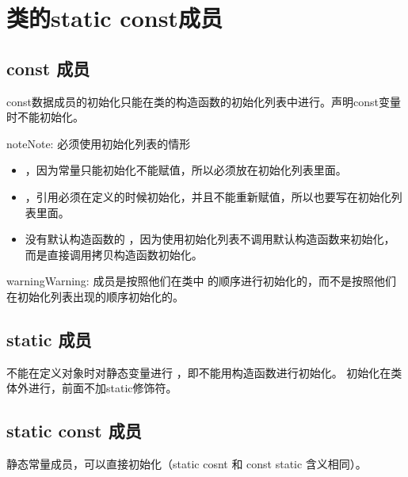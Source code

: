 \documentclass[letterpaper,10pt,english]{sphinxmanual}
\begin{document}
\section{类的static const成员}
\label{\detokenize{cpp/16_staticconst:static-const}}\label{\detokenize{cpp/16_staticconst::doc}}

\subsection{const 成员}
\label{\detokenize{cpp/16_staticconst:const}}
const数据成员的初始化只能在类的构造函数的初始化列表中进行。声明const变量时不能初始化。

\begin{sphinxadmonition}{note}{Note:}
必须使用初始化列表的情形
\begin{itemize}
\item {} 
 ，因为常量只能初始化不能赋值，所以必须放在初始化列表里面。

\item {} 
 ，引用必须在定义的时候初始化，并且不能重新赋值，所以也要写在初始化列表里面。

\item {} 
没有默认构造函数的  ，因为使用初始化列表不调用默认构造函数来初始化，而是直接调用拷贝构造函数初始化。

\end{itemize}
\end{sphinxadmonition}

\begin{sphinxadmonition}{warning}{Warning:}
成员是按照他们在类中  的顺序进行初始化的，而不是按照他们在初始化列表出现的顺序初始化的。
\end{sphinxadmonition}


\subsection{static 成员}
\label{\detokenize{cpp/16_staticconst:static}}
不能在定义对象时对静态变量进行  ，即不能用构造函数进行初始化。
初始化在类体外进行，前面不加static修饰符。


\subsection{static const 成员}
\label{\detokenize{cpp/16_staticconst:id1}}
静态常量成员，可以直接初始化（static cosnt 和 const static 含义相同）。
\end{document}
